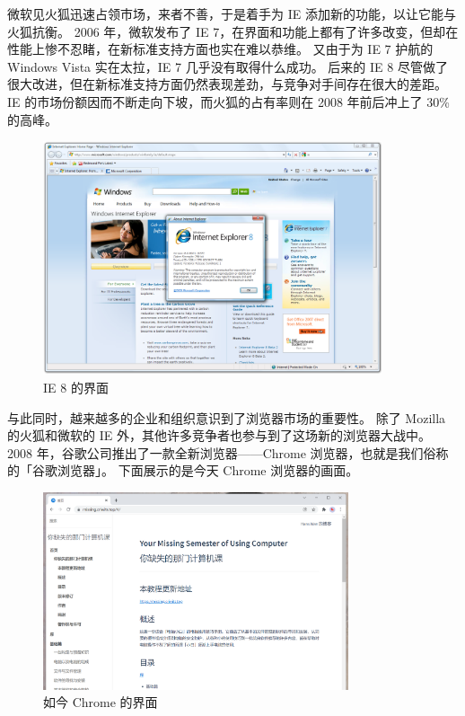 微软见火狐迅速占领市场，来者不善，于是着手为 IE 添加新的功能，以让它能与火狐抗衡。
2006 年，微软发布了 IE 7，在界面和功能上都有了许多改变，但却在性能上惨不忍睹，在新标准支持方面也实在难以恭维。
又由于为 IE 7 护航的 Windows Vista 实在太拉，IE 7 几乎没有取得什么成功。
后来的 IE 8 尽管做了很大改进，但在新标准支持方面仍然表现差劲，与竞争对手间存在很大的差距。
IE 的市场份额因而不断走向下坡，而火狐的占有率则在 2008 年前后冲上了 30\% 的高峰。

\begin{figure}[htb!]
  \centering
  \includegraphics[width=10cm]{assets/IE_8.png}
  \caption{IE 8 的界面}
  \label{IE_8}
\end{figure}

与此同时，越来越多的企业和组织意识到了浏览器市场的重要性。
除了 Mozilla 的火狐和微软的 IE 外，其他许多竞争者也参与到了这场新的浏览器大战中。
2008 年，谷歌公司推出了一款全新浏览器——Chrome 浏览器，也就是我们俗称的「谷歌浏览器」。
下面展示的是今天 Chrome 浏览器的画面。

\begin{figure}[htb!]
  \centering
  \includegraphics[width=9cm]{assets/Chrome_Example.png}
  \caption{如今 Chrome 的界面}
  \label{Chrome_Example}
\end{figure}

